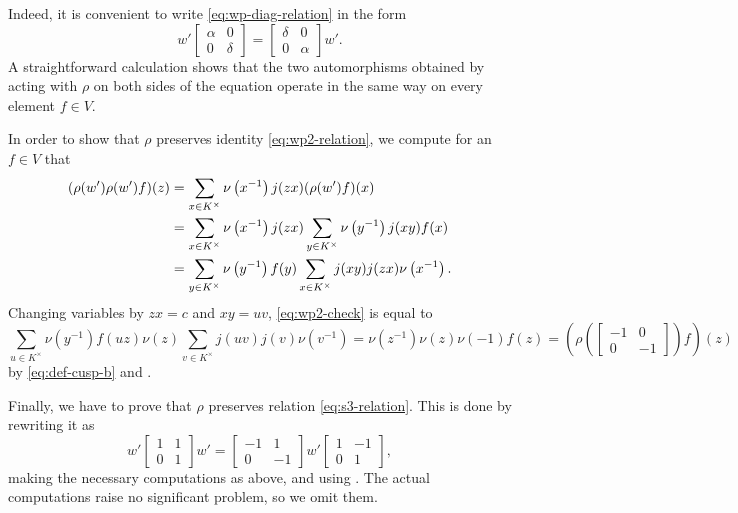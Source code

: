 \documentclass[../main.tex]{subfiles}
\begin{document}
Indeed, it is convenient to write \eqref{eq:wp-diag-relation} in the form
\[w'\begin{bmatrix}
	\alpha & 0 \\
	0 & \delta
\end{bmatrix}=\begin{bmatrix}
	\delta & 0 \\
	0 & \alpha
\end{bmatrix}w'.\]
A straightforward calculation shows that the two automorphisms obtained by acting with $\rho$ on both sides of the equation operate in the same way on every element $f\in V$.

In order to show that $\rho$ preserves identity \eqref{eq:wp2-relation}, we compute for an $f\in V$ that
\begin{align}
	(\rho(w')\rho(w')f)(z) &= \sum_{x\in K^\times}\nu\left(x^{-1}\right)j(zx)(\rho(w')f)(x) \notag \\
	&= \sum_{x\in K^\times}\nu\left(x^{-1}\right)j(zx)\sum_{y\in K^\times}\nu\left(y^{-1}\right)j(xy)f(x) \notag \\
	&= \sum_{y\in K^\times}\nu\left(y^{-1}\right)f(y)\sum_{x\in K^\times}j(xy)j(zx)\nu\left(x^{-1}\right). \label{eq:wp2-check}
\end{align}
Changing variables by $zx=c$ and $xy=uv$, \eqref{eq:wp2-check} is equal to
\[\sum_{u\in K^\times}\nu\left(y^{-1}\right)f(uz)\nu(z)\sum_{v\in K^\times}j(uv)j(v)\nu\left(v^{-1}\right)=\nu\left(z^{-1}\right)\nu(z)\nu(-1)f(z)=\left(\rho\left(\begin{bmatrix}
	-1 & 0 \\
	0 & -1
\end{bmatrix}\right)f\right)(z)\]
by \eqref{eq:def-cusp-b} and .

Finally, we have to prove that $\rho$ preserves relation \eqref{eq:s3-relation}. This is done by rewriting it as
\[w'\begin{bmatrix}
	1 & 1 \\
	0 & 1
\end{bmatrix}w'=\begin{bmatrix}
	-1 & 1 \\
	0 & -1
\end{bmatrix}w'\begin{bmatrix}
	1 & -1 \\
	0 & 1
\end{bmatrix},\]
making the necessary computations as above, and using . The actual computations raise no significant problem, so we omit them.
\end{document}
